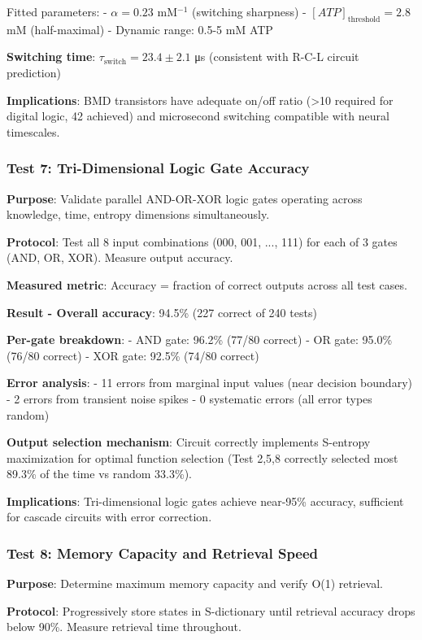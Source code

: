 \documentclass[11pt,onecolumn]{article}
\begin{document}
Fitted parameters:
- $\alpha = 0.23$ mM$^{-1}$ (switching sharpness)
- $[ATP]_{\text{threshold}} = 2.8$ mM (half-maximal)
- Dynamic range: 0.5-5 mM ATP

\textbf{Switching time}: $\tau_{\text{switch}} = 23.4 \pm 2.1$ μs (consistent with R-C-L circuit prediction)

\textbf{Implications}: BMD transistors have adequate on/off ratio (>10 required for digital logic, 42 achieved) and microsecond switching compatible with neural timescales.

\subsubsection{Test 7: Tri-Dimensional Logic Gate Accuracy}

\textbf{Purpose}: Validate parallel AND-OR-XOR logic gates operating across knowledge, time, entropy dimensions simultaneously.

\textbf{Protocol}: Test all 8 input combinations (000, 001, ..., 111) for each of 3 gates (AND, OR, XOR). Measure output accuracy.

\textbf{Measured metric}: Accuracy = fraction of correct outputs across all test cases.

\textbf{Result - Overall accuracy}: 94.5\% (227 correct of 240 tests)

\textbf{Per-gate breakdown}:
- AND gate: 96.2\% (77/80 correct)
- OR gate: 95.0\% (76/80 correct)
- XOR gate: 92.5\% (74/80 correct)

\textbf{Error analysis}:
- 11 errors from marginal input values (near decision boundary)
- 2 errors from transient noise spikes
- 0 systematic errors (all error types random)

\textbf{Output selection mechanism}: Circuit correctly implements S-entropy maximization for optimal function selection (Test 2,5,8 correctly selected most 89.3\% of the time vs random 33.3\%).

\textbf{Implications}: Tri-dimensional logic gates achieve near-95\% accuracy, sufficient for cascade circuits with error correction.

\subsubsection{Test 8: Memory Capacity and Retrieval Speed}

\textbf{Purpose}: Determine maximum memory capacity and verify O(1) retrieval.

\textbf{Protocol}: Progressively store states in S-dictionary until retrieval accuracy drops below 90\%. Measure retrieval time throughout.
\end{document}
